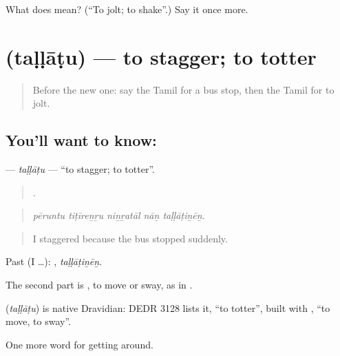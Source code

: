 \begin{tcolorbox}[breakable,colback=teal!4,colframe=teal!35!black,title={Before you move on}]
What does  mean? (\textquotedblleft{}To jolt; to shake\textquotedblright{}.) Say it once more.
\end{tcolorbox}
\section[\texorpdfstring{\ta{தள்ளாடு} (taḷḷāṭu)}{தள்ளாடு (taḷḷāṭu)}]{ (taḷḷāṭu) — to stagger; to totter}

\label{lesson:TA-C401-tallatu}



\begin{quote}
Before the new one: say the Tamil for a bus stop, then the Tamil for to jolt.
\end{quote}

\subsection*{You'll want to know: }
\textbf{} — \emph{taḷḷāṭu} — \textquotedblleft{}to stagger; to totter\textquotedblright{}.

\begin{quote}
    .
\end{quote}

\begin{quote}
\emph{pēruntu tiṭīreṉṟu niṉṟatāl nāṉ taḷḷāṭiṉēṉ.}
\end{quote}

\begin{quote}
I staggered because the bus stopped suddenly.
\end{quote}

Past (I …): , \emph{taḷḷāṭiṉēṉ}.

The second part is , to move or sway, as in .

\begin{cousinweb}
\textbf{} (\emph{taḷḷāṭu}) is native Dravidian: DEDR 3128 lists it, \textquotedblleft{}to totter\textquotedblright{}, built with , \textquotedblleft{}to move, to sway\textquotedblright{}.
\end{cousinweb}

\begin{grammarlens}[title={What you've built}]
One more word for getting around.
\end{grammarlens}

